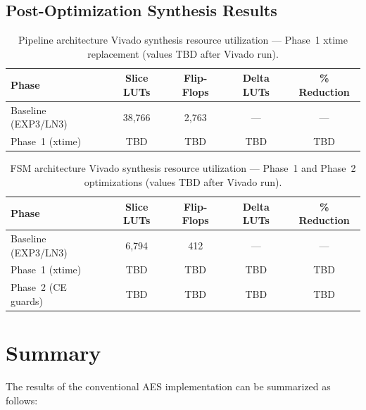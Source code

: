 \FloatBarrier

\subsection{Post-Optimization Synthesis Results}

\begin{table}[!htbp]
\centering
\caption{Pipeline architecture Vivado synthesis resource utilization --- Phase~1
xtime replacement (values TBD after Vivado run).}
\label{tab:pipeline_ph1_resources}
\renewcommand{\arraystretch}{1.15}
\begin{tabular}{lcccc}
    \hline
    \textbf{Phase} & \textbf{Slice LUTs} & \textbf{Flip-Flops} &
    \textbf{Delta LUTs} & \textbf{\% Reduction} \\
    \hline
    Baseline (EXP3/LN3) & 38,766 & 2,763 & --- & --- \\
    Phase~1 (xtime)     & TBD    & TBD   & TBD & TBD \\
    \hline
\end{tabular}
\end{table}

\FloatBarrier

\begin{table}[!htbp]
\centering
\caption{FSM architecture Vivado synthesis resource utilization --- Phase~1 and
Phase~2 optimizations (values TBD after Vivado run).}
\label{tab:fsm_ph2_resources}
\renewcommand{\arraystretch}{1.15}
\begin{tabular}{lcccc}
    \hline
    \textbf{Phase} & \textbf{Slice LUTs} & \textbf{Flip-Flops} &
    \textbf{Delta LUTs} & \textbf{\% Reduction} \\
    \hline
    Baseline (EXP3/LN3)       &  6,794 & 412 & --- & --- \\
    Phase~1 (xtime)           & TBD    & TBD & TBD & TBD \\
    Phase~2 (CE guards)       & TBD    & TBD & TBD & TBD \\
    \hline
\end{tabular}
\end{table}

\FloatBarrier

\section{Summary}

The results of the conventional AES implementation can be summarized as follows:

